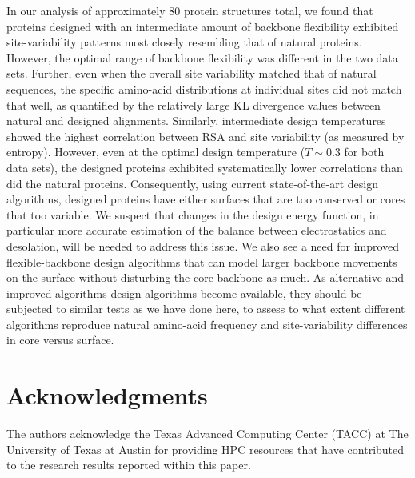 \documentclass[12pt]{article}
\begin{document}
In our analysis of approximately 80 protein structures total, we found that proteins designed with an intermediate amount of backbone flexibility exhibited site-variability patterns most closely resembling that of natural proteins.  However, the optimal range of backbone flexibility was different in the two data sets. Further, even when the overall site variability matched that of natural sequences, the specific amino-acid distributions at individual sites did not match that well, as quantified by the relatively large KL divergence values between natural and designed alignments. Similarly, intermediate design temperatures showed the highest correlation between RSA and site variability (as measured by entropy). However, even at the optimal design temperature ($T \sim 0.3$ for both data sets), the designed proteins exhibited systematically lower correlations than did the natural proteins. Consequently, using current state-of-the-art design algorithms, designed proteins have either surfaces that are too conserved or cores that too variable. We suspect that changes in the design energy function, in particular more accurate estimation of the balance between electrostatics and desolation, will be needed to address this issue. We also see a need for improved flexible-backbone design algorithms that can model larger backbone movements on the surface without disturbing the core backbone as much. As alternative and improved algorithms design algorithms become available, they should be subjected to similar tests as we have done here, to assess to what extent different algorithms reproduce natural amino-acid frequency and site-variability differences in core versus surface.



\section{Acknowledgments}

The authors acknowledge the Texas Advanced Computing Center (TACC) at The University of Texas at Austin for providing HPC resources that have contributed to the research results reported within this paper. 

\end{document}
